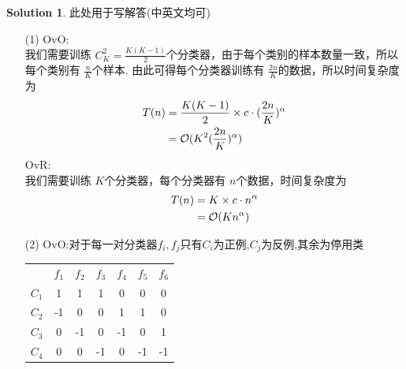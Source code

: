 \documentclass[a4paper,UTF8]{article}
\numberwithin{equation}{section}
\theoremstyle{definition}
\newtheorem*{solution}{Solution}
\begin{document}
\begin{solution}
	此处用于写解答(中英文均可)
	\begin{itemize}
		\item[(1)] OvO:\\
		我们需要训练 $C_K^2 = \frac{K(K-1)}{2}$个分类器，由于每个类别的样本数量一致，所以每个类别有 $\frac{n}{K}$个样本. 
		由此可得每个分类器训练有 $\frac{2n}{K}$的数据，所以时间复杂度为
		\begin{equation}
			\begin{split}
				T(n) &= \frac{K(K-1)}{2} \times c\cdot (\frac{2n}{K})^\alpha \\
				&= \mathcal{O}(K^2 (\frac{2n}{K})^\alpha)
			\end{split}
			\notag
		\end{equation}
		OvR: \\
		我们需要训练 $K$个分类器，每个分类器有 $n$个数据，时间复杂度为
		\begin{equation}
			\begin{split}
				T(n) &= K \times c\cdot n^\alpha \\
				&= \mathcal{O}(K n^\alpha)
			\end{split}
			\notag
		\end{equation}
		\item[(2)]
		OvO:对于每一对分类器$f_i,f_j$只有$C_i$为正例,$C_j$为反例,其余为停用类 \\
		\begin{table}[H]
			\centering
			\begin{tabular}{ccccccc}
									   & $f_1$                   & $f_2$                   & $f_3$                   & $f_4$                   & $f_5$                   & $f_6$                   \\ \cline{2-7} 
			\multicolumn{1}{c|}{$C_1$} & \multicolumn{1}{c|}{1}  & \multicolumn{1}{c|}{1}  & \multicolumn{1}{c|}{1}  & \multicolumn{1}{c|}{0}  & \multicolumn{1}{c|}{0}  & \multicolumn{1}{c|}{0}  \\ \cline{2-7} 
			\multicolumn{1}{c|}{$C_2$} & \multicolumn{1}{c|}{-1} & \multicolumn{1}{c|}{0}  & \multicolumn{1}{c|}{0}  & \multicolumn{1}{c|}{1}  & \multicolumn{1}{c|}{1}  & \multicolumn{1}{c|}{0}  \\ \cline{2-7} 
			\multicolumn{1}{c|}{$C_3$} & \multicolumn{1}{c|}{0}  & \multicolumn{1}{c|}{-1} & \multicolumn{1}{c|}{0}  & \multicolumn{1}{c|}{-1} & \multicolumn{1}{c|}{0}  & \multicolumn{1}{c|}{1}  \\ \cline{2-7} 
			\multicolumn{1}{c|}{$C_4$} & \multicolumn{1}{c|}{0}  & \multicolumn{1}{c|}{0}  & \multicolumn{1}{c|}{-1} & \multicolumn{1}{c|}{0}  & \multicolumn{1}{c|}{-1} & \multicolumn{1}{c|}{-1} \\ \cline{2-7} 

\end{tabular}
\end{table}
\end{itemize}
\end{solution}
\end{document}
